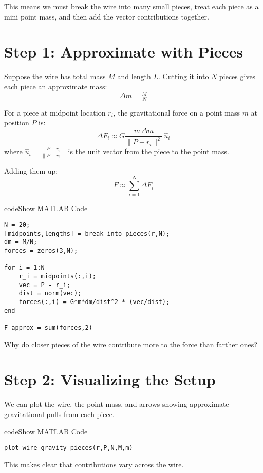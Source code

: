 \documentclass{ximera}
\begin{document}
This means we must break the wire into many small pieces, treat each piece as a mini point mass, and then add the vector contributions together.

\section*{Step 1: Approximate with Pieces}

Suppose the wire has total mass $M$ and length $L$. Cutting it into $N$ pieces gives each piece an approximate mass:
$$
\Delta m = \tfrac{M}{N}
$$

For a piece at midpoint location $r_i$, the gravitational force on a point mass $m$ at position $P$ is:
$$
\Delta F_i \approx G \frac{m \,\Delta m}{\|P-r_i\|^2}\,\hat{u}_i
$$
where $\hat{u}_i = \tfrac{P-r_i}{\|P-r_i\|}$ is the unit vector from the piece to the point mass.  

Adding them up:
$$
F \approx \sum_{i=1}^N \Delta F_i
$$

\begin{expandable}{code}{Show MATLAB Code}
\begin{verbatim}
N = 20;
[midpoints,lengths] = break_into_pieces(r,N);
dm = M/N;
forces = zeros(3,N);

for i = 1:N
    r_i = midpoints(:,i);
    vec = P - r_i;
    dist = norm(vec);
    forces(:,i) = G*m*dm/dist^2 * (vec/dist);
end

F_approx = sum(forces,2)
\end{verbatim}
\end{expandable}

\begin{problem}
Why do closer pieces of the wire contribute more to the force than farther ones? 
\end{problem}

\section*{Step 2: Visualizing the Setup}

We can plot the wire, the point mass, and arrows showing approximate gravitational pulls from each piece.  

\begin{expandable}{code}{Show MATLAB Code}
\begin{verbatim}
plot_wire_gravity_pieces(r,P,N,M,m)
\end{verbatim}
\end{expandable}

This makes clear that contributions vary across the wire.
\end{document}

